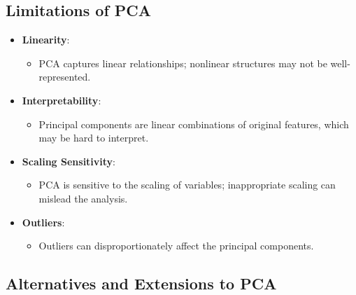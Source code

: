\documentclass{article}
\begin{document}
\subsection{Limitations of PCA}

\begin{itemize}
    \item \textbf{Linearity}:
    \begin{itemize}
        \item PCA captures linear relationships; nonlinear structures may not be well-represented.
    \end{itemize}
    \item \textbf{Interpretability}:
    \begin{itemize}
        \item Principal components are linear combinations of original features, which may be hard to interpret.
    \end{itemize}
    \item \textbf{Scaling Sensitivity}:
    \begin{itemize}
        \item PCA is sensitive to the scaling of variables; inappropriate scaling can mislead the analysis.
    \end{itemize}
    \item \textbf{Outliers}:
    \begin{itemize}
        \item Outliers can disproportionately affect the principal components.
    \end{itemize}
\end{itemize}

\subsection{Alternatives and Extensions to PCA}
\end{document}
